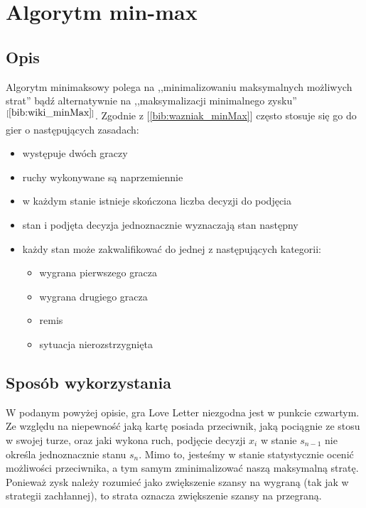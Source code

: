 \section{Algorytm min-max}
\label{sec:minmax}
\subsection{Opis}
Algorytm minimaksowy polega na ,,minimalizowaniu maksymalnych możliwych strat'' bądź alternatywnie na ,,maksymalizacji minimalnego zysku''$^{[\ref{bib:wiki_minMax}]}$. Zgodnie z [\ref{bib:wazniak_minMax}] często stosuje się go do gier o następujących zasadach:
\begin{itemize}
	\item występuje dwóch graczy
	\item ruchy wykonywane są naprzemiennie
	\item w każdym stanie istnieje skończona liczba decyzji do podjęcia
	\item stan i podjęta decyzja jednoznacznie wyznaczają stan następny
	\item każdy stan może zakwalifikować do jednej z następujących kategorii:
	\begin{itemize}
		\item wygrana pierwszego gracza
		\item wygrana drugiego gracza
		\item remis
		\item sytuacja nierozstrzygnięta
	\end{itemize}
\end{itemize}

\subsection{Sposób wykorzystania}
W podanym powyżej opisie, gra Love Letter niezgodna jest w punkcie czwartym. Ze względu na niepewność jaką kartę posiada przeciwnik, jaką pociągnie ze stosu w swojej turze, oraz jaki wykona ruch, podjęcie decyzji $x_i$ w stanie $s_{n-1}$ nie określa jednoznacznie stanu $s_n$. Mimo to, jesteśmy w stanie statystycznie ocenić możliwości przeciwnika, a tym samym zminimalizować naszą maksymalną stratę. Ponieważ zysk należy rozumieć jako zwiększenie szansy na wygraną (tak jak w strategii zachłannej), to strata oznacza zwiększenie szansy na przegraną. 


